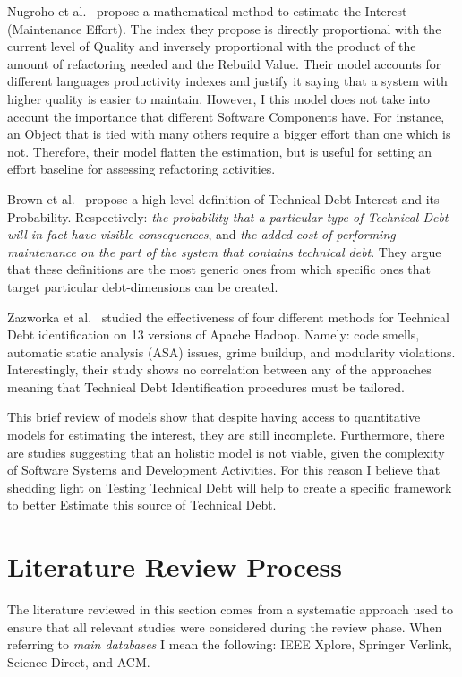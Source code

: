 Nugroho et al.\ \cite{technicalDebtInterest} propose a mathematical method to estimate the Interest (Maintenance Effort). The index they propose is directly proportional with the current level of Quality and inversely proportional with the product of the amount of refactoring needed and the Rebuild Value. Their model accounts for different languages productivity indexes and justify it saying that a system with higher quality is easier to maintain. However, I this model does not take into account the importance that different Software Components have. For instance, an Object that is tied with many others require a bigger effort than one which is not. Therefore, their model flatten the estimation, but is useful for setting an effort baseline for assessing refactoring activities.

Brown et al.\ \cite{td_current_vs_optimal_quality} propose a high level definition of Technical Debt Interest and its Probability. Respectively: \textit{the probability that a particular type of Technical Debt will in fact have visible consequences}, and \textit{the added cost of performing maintenance
on the part of the system that contains technical debt}. They argue that these definitions are the most generic ones from which specific ones that target particular debt-dimensions can be created.

Zazworka et al.\ \cite{4_methods_to_identify_td} studied the effectiveness of four different methods for Technical Debt identification on 13 versions of Apache Hadoop. Namely: code smells, automatic static analysis (ASA) issues, grime
buildup, and modularity violations. Interestingly, their study shows no correlation between any of the approaches meaning that Technical Debt Identification procedures must be tailored.

This brief review of models show that despite having access to quantitative models for estimating the interest, they are still incomplete. Furthermore, there are studies suggesting that an holistic model is not viable, given the complexity of Software Systems and Development Activities. For this reason I believe that shedding light on Testing Technical Debt will help to create a specific framework to better Estimate this source of Technical Debt.





\section{Literature Review Process} \label{literature_review_process}
The literature reviewed in this section comes from a systematic approach used to ensure that all relevant studies were considered during the review phase. When referring to \textit{main databases} I mean the following: IEEE Xplore, Springer Verlink, Science Direct, and ACM.

